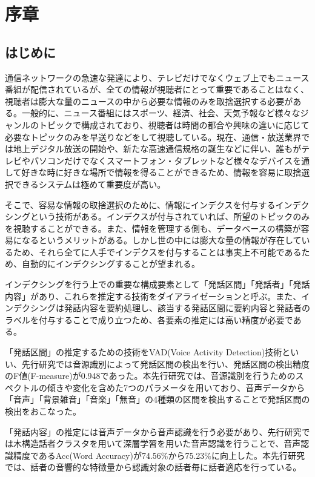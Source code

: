 \chapter{序章}
\section{はじめに}
通信ネットワークの急速な発達により、テレビだけでなくウェブ上でもニュース番組が配信されているが、全ての情報が視聴者にとって重要であることはなく、視聴者は膨大な量のニュースの中から必要な情報のみを取捨選択する必要がある。一般的に、ニュース番組にはスポーツ、経済、社会、天気予報など様々なジャンルのトピックで構成されており、視聴者は時間の都合や興味の違いに応じて必要なトピックのみを早送りなどをして視聴している。現在、通信・放送業界では地上デジタル放送の開始や、新たな高速通信規格の誕生などに伴い、誰もがテレビやパソコンだけでなくスマートフォン・タブレットなど様々なデバイスを通して好きな時に好きな場所で情報を得ることができるため、情報を容易に取捨選択できるシステムは極めて重要度が高い。\par

そこで、容易な情報の取捨選択のために、情報にインデクスを付与するインデクシングという技術がある。インデクスが付与されていれば、所望のトピックのみを視聴することができる。また、情報を管理する側も、データベースの構築が容易になるというメリットがある。しかし世の中には膨大な量の情報が存在しているため、それら全てに人手でインデクスを付与することは事実上不可能であるため、自動的にインデクシングすることが望まれる。\par

インデクシングを行う上での重要な構成要素として「発話区間」「発話者」「発話内容」があり、これらを推定する技術をダイアライゼーションと呼ぶ。また、インデクシングは発話内容を要約処理し、該当する発話区間に要約内容と発話者のラベルを付与することで成り立つため、各要素の推定には高い精度が必要である。\par

「発話区間」の推定するための技術をVAD(Voice Activity Detection)技術といい、先行研究\cite{yamaguchi_indexing}では音源識別によって発話区間の検出を行い、発話区間の検出精度のF値(F-measure)が0.948であった。本先行研究では、音源識別を行うためのスペクトルの傾きや変化を含めた7つのパラメータを用いており、音声データから「音声」「背景雑音」「音楽」「無音」の4種類の区間を検出することで発話区間の検出をおこなった。\par

「発話内容」の推定には音声データから音声認識を行う必要があり、先行研究\cite{yoshimura_clustering}では木構造話者クラスタを用いて深層学習を用いた音声認識を行うことで、音声認識精度であるAcc(Word Accuracy)が74.56\%から75.23\%に向上した。本先行研究では、話者の音響的な特徴量から認識対象の話者毎に話者適応を行っている。\par

